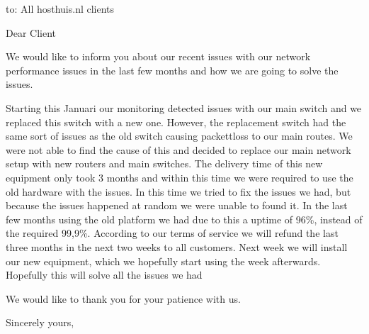 \documentclass{letter} %
\begin{document}
\signature{Hosthuis.nl, \\Paul Sohier}           %
\longindentation=0pt                       %
\let\raggedleft\raggedright                %
 
 
\begin{letter}{to: All hosthuis.nl clients}

\opening{Dear Client} 
 
\noindent 
We would like to inform you about our recent issues with our network performance issues in the last few months and how we are going to solve the issues.

\noindent
Starting this Januari our monitoring detected issues with our main switch and we replaced this switch with a new one. However, the replacement switch had the same sort of issues as the old switch causing packettloss to our main routes. We were not able to find the cause of this and decided to replace our main network setup with new routers and main switches. The delivery time of this new equipment only took 3 months and within this time we were required to use the old hardware with the issues. In this time we tried to fix the issues we had, but because the issues happened at random we were unable to found it. In the last few months using the old platform we had due to this a uptime of 96\%, instead of the required 99,9\%. According to our terms of service we will refund the last three months in the next two weeks to all customers. 
Next week we will install our new equipment, which we hopefully start using the week afterwards. Hopefully this will solve all the issues we had
 
We would like to thank you for your patience with us.
 
\closing{Sincerely yours,} 
 

 
\encl{}					%

\end{letter}
 
\end{document}
